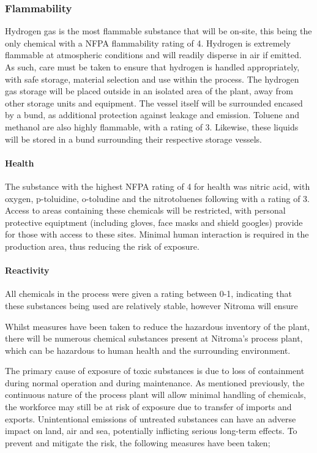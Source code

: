 \subsubsection{Flammability}

Hydrogen gas is the most flammable substance that will be on-site, this being the only chemical with a NFPA flammability rating of 4.  Hydrogen is extremely flammable at atmospheric conditions and will readily disperse in air if emitted. As such, care must be taken to ensure that hydrogen is handled appropriately, with safe storage, material selection and use within the process. The hydrogen gas storage will be placed outside in an isolated area of the plant, away from other storage units and equipment. The vessel itself will be surrounded encased by a bund, as additional protection against leakage and emission. Toluene and methanol are also highly flammable, with a rating of 3. Likewise, these liquids will be stored in a bund surrounding their respective storage vessels. 



\paragraph{Health}{}

The substance with the highest NFPA rating of 4 for health was nitric acid, with oxygen, p-toluidine, o-toludine and the nitrotoluenes following with a rating of 3. Access to areas containing these chemicals will be restricted, with personal protective equiptment (including gloves, face masks and shield googles) provide for those with access to these sites. Minimal human interaction is required in the production area, thus reducing the risk of exposure.

\paragraph{Reactivity}

All chemicals in the process were given a rating between 0-1, indicating that these substances being used are relatively stable, however Nitroma will ensure 



Whilst measures have been taken to reduce the hazardous inventory of the plant, there will be numerous chemical substances present at Nitroma's process plant, which can be hazardous to human health and the surrounding environment. 


The primary cause of exposure of toxic substances is due to loss of containment during normal operation and during maintenance. As mentioned previously, the continuous nature of the process plant will allow minimal handling of chemicals, the workforce may still be at risk of exposure due to transfer of imports and exports. Unintentional emissions of untreated substances can have an adverse impact on land, air and sea, potentially inflicting serious long-term effects. To prevent and mitigate the risk, the following measures have been taken;

